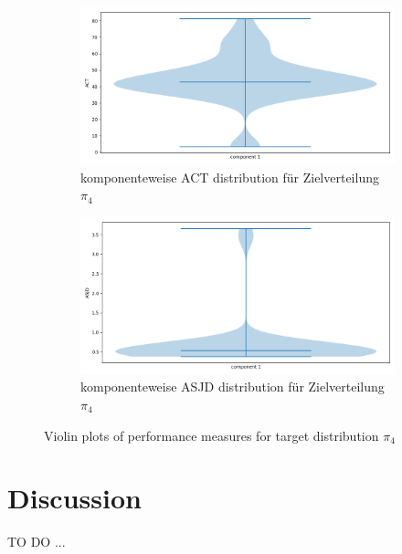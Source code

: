 \documentclass{scrartcl}
\begin{document}
    \begin{figure}
        \centering
        \begin{subfigure}{0.45\textheight}
              \centering
              \includegraphics[width=.8\linewidth]{../figs/ACT_pi_4.png}
              \caption{komponenteweise ACT distribution für Zielverteilung $\pi_4$}
              \label{violin_plots_pi_4_act}
        \end{subfigure}
        \begin{subfigure}{0.45\textheight}
              \centering
              \includegraphics[width=.8\linewidth]{../figs/ASJD_pi_4.png}
              \caption{komponenteweise ASJD distribution für Zielverteilung $\pi_4$}
              \label{violin_plots_pi_4_asjd}
        \end{subfigure}
        \caption{Violin plots of performance measures for target distribution $\pi_4$}
        \label{violin_plots_pi_4}
    \end{figure}

    \section{Discussion}
    TO DO ...
\end{document}
